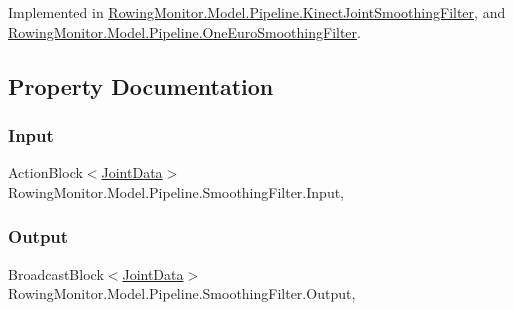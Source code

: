 Implemented in \hyperlink{class_rowing_monitor_1_1_model_1_1_pipeline_1_1_kinect_joint_smoothing_filter_a93cb6db0e00796dd2791789e472457b5}{Rowing\+Monitor.\+Model.\+Pipeline.\+Kinect\+Joint\+Smoothing\+Filter}, and \hyperlink{class_rowing_monitor_1_1_model_1_1_pipeline_1_1_one_euro_smoothing_filter_a2e518ce98440b3004aaf1af9a4eba399}{Rowing\+Monitor.\+Model.\+Pipeline.\+One\+Euro\+Smoothing\+Filter}.



\subsection{Property Documentation}
\mbox{\label{class_rowing_monitor_1_1_model_1_1_pipeline_1_1_smoothing_filter_a92bef5838dd409b0795f5b94c1ea45d5}} 
\subsubsection{\texorpdfstring{Input}{Input}}
{\footnotesize\ttfamily Action\+Block$<$\hyperlink{struct_rowing_monitor_1_1_model_1_1_util_1_1_joint_data}{Joint\+Data}$>$ Rowing\+Monitor.\+Model.\+Pipeline.\+Smoothing\+Filter.\+Input\hspace{0.3cm}{\ttfamily [get]}, {\ttfamily [set]}}

\mbox{\label{class_rowing_monitor_1_1_model_1_1_pipeline_1_1_smoothing_filter_a3151be406d68f220c45b674df65f0df5}} 
\subsubsection{\texorpdfstring{Output}{Output}}
{\footnotesize\ttfamily Broadcast\+Block$<$\hyperlink{struct_rowing_monitor_1_1_model_1_1_util_1_1_joint_data}{Joint\+Data}$>$ Rowing\+Monitor.\+Model.\+Pipeline.\+Smoothing\+Filter.\+Output\hspace{0.3cm}{\ttfamily [get]}, {\ttfamily [set]}}

